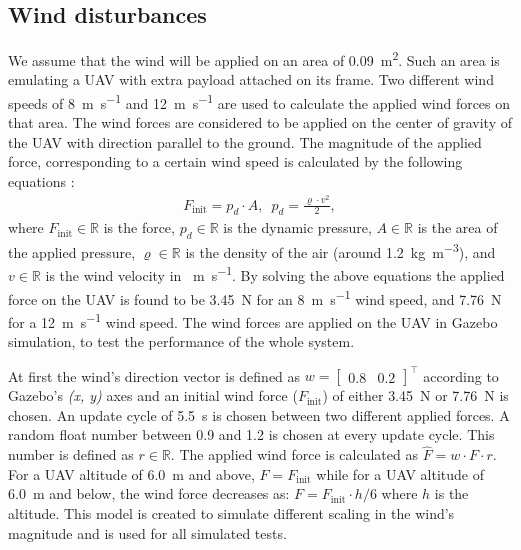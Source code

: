 \documentclass[conference]{IEEEtran}
\begin{document}
\subsection{Wind disturbances}
\label{sec:WindDisturbances}
We assume that the wind will be
applied on an area of \SI{0.09}{\m^2}. Such an area is emulating a UAV
with extra payload attached on its frame. Two different wind speeds of
\SI{8}{\m \per \s} and \SI{12}{\m \per \s} are used to calculate the applied wind forces
on that area. The wind forces are considered to be applied on the
center of gravity of the UAV with direction parallel to the ground. The magnitude of the applied force, corresponding to a certain wind
speed is calculated by the following equations
\cite{Dynamic_pressure_NASA,anderson2010fundamentals}:
\begin{equation}
    \begin{array}{l}
         F_{\textrm{init}} = p_{d} \cdot A,\,\,\,
         p_{d} = \frac{\varrho \cdot v^2}{2},
    \end{array}
\end{equation}
\noindent where $F_{\text{init}}\in\mathbb{R}$ is the force, \(p_{d}\in\mathbb{R}\) is the dynamic pressure, \(A\in\mathbb{R}\) is
the area of the applied pressure, \(\varrho\in\mathbb{R}\) is the density of the
air (around \SI{1.2}{\kg \per \m^3}), and \(v\in\mathbb{R}\) is the wind velocity in \SI{}{\m \per \s}. By solving the above equations the applied force on the UAV is found
to be \SI{3.45}{\newton} for an \SI{8}{\m \per \s} wind speed, and 
\SI{7.76}{\newton} for a \SI{12}{\m \per \s}
wind speed. The wind forces are applied on the UAV in Gazebo
simulation, to test the performance of the whole system. 
%

At first the wind's direction vector is defined as
$w=\begin{bmatrix}0.8 & 0.2\end{bmatrix}^\top$ according to Gazebo's \emph{(x, y)} axes and an initial wind force ($F_{\text{init}}$) of either \SI{3.45}{\newton} or \SI{7.76}{\newton} is chosen. An update cycle of \SI{5.5}{\second} is chosen between two different applied forces. A random float number between \SI{0.9}{} and \SI{1.2}{} is chosen at every update cycle. This number is defined as $r\in\mathbb{R}$. The applied wind force is calculated as $\hat{F}=w\cdot F\cdot r$. For a UAV altitude of \SI{6.0}{\meter} and above, $F=F_{\text{init}}$ while for a UAV altitude of \SI{6.0}{\meter} and below, the wind force decreases as:
   $F=F_{\text{init}}\cdot h/ 6$ where $h$ is the altitude. This model is created to simulate different scaling in the wind's magnitude and is used for all simulated tests.
\end{document}
